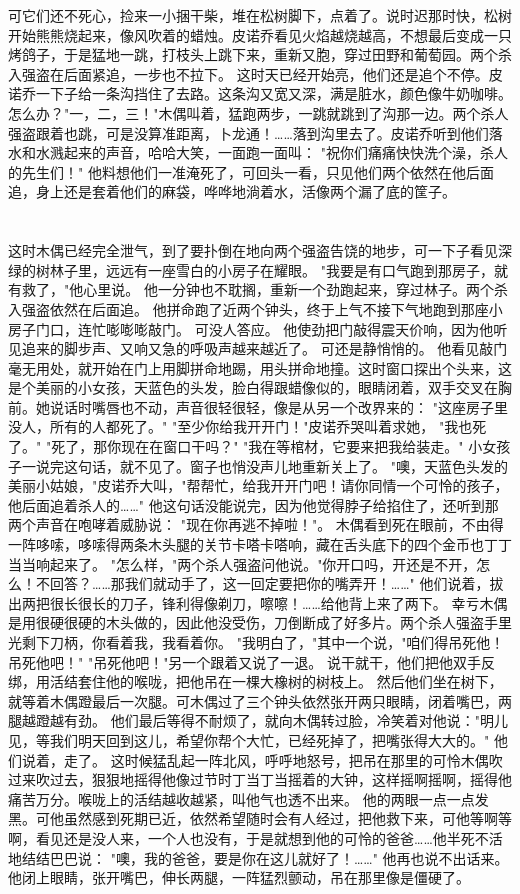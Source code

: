 \documentclass[12pt,UTF8]{ctexbook}
\begin{document}
可它们还不死心，捡来一小捆干柴，堆在松树脚下，点着了。说时迟那时快，松树开始熊熊烧起来，像风吹着的蜡烛。皮诺乔看见火焰越烧越高，不想最后变成一只烤鸽子，于是猛地一跳，打枝头上跳下来，重新又胞，穿过田野和葡萄园。两个杀入强盗在后面紧追，一步也不拉下。
这时天已经开始亮，他们还是追个不停。皮诺乔一下子给一条沟挡住了去路。这条沟又宽又深，满是脏水，颜色像牛奶咖啡。怎么办？"一，二，三！"木偶叫着，猛跑两步，一跳就跳到了沟那一边。两个杀人强盗跟着也跳，可是没算准距离，卜龙通！……落到沟里去了。皮诺乔听到他们落水和水溅起来的声音，哈哈大笑，一面跑一面叫：
"祝你们痛痛快快洗个澡，杀人的先生们！"
他料想他们一准淹死了，可回头一看，只见他们两个依然在他后面追，身上还是套着他们的麻袋，哗哗地淌着水，活像两个漏了底的筐子。

\chapter{}

这时木偶已经完全泄气，到了要扑倒在地向两个强盗告饶的地步，可一下子看见深绿的树林子里，远远有一座雪白的小房子在耀眼。
"我要是有口气跑到那房子，就有救了，"他心里说。
他一分钟也不耽搁，重新一个劲跑起来，穿过林子。两个杀入强盗依然在后面追。
他拼命跑了近两个钟头，终于上气不接下气地跑到那座小房子门口，连忙嘭嘭嘭敲门。
可没人答应。
他使劲把门敲得震天价响，因为他听见追来的脚步声、又响又急的呼吸声越来越近了。
可还是静悄悄的。
他看见敲门毫无用处，就开始在门上用脚拼命地踢，用头拼命地撞。这时窗口探出个头来，这是个美丽的小女孩，天蓝色的头发，脸白得跟蜡像似的，眼睛闭着，双手交叉在胸前。她说话时嘴唇也不动，声音很轻很轻，像是从另一个改界来的：
"这座房子里没人，所有的人都死了。"
"至少你给我开开门！"皮诺乔哭叫着求她，
"我也死了。"
"死了，那你现在在窗口干吗？"
"我在等棺材，它要来把我给装走。"
小女孩子一说完这句话，就不见了。窗子也悄没声儿地重新关上了。
"噢，天蓝色头发的美丽小姑娘，"皮诺乔大叫，"帮帮忙，给我开开门吧！请你同情一个可怜的孩子，他后面追着杀人的……"
他这句话没能说完，因为他觉得脖子给掐住了，还听到那两个声音在咆哮着威胁说：
"现在你再逃不掉啦！"。
木偶看到死在眼前，不由得一阵哆嗦，哆嗦得两条木头腿的关节卡嗒卡嗒响，藏在舌头底下的四个金币也丁丁当当响起来了。
"怎么样，"两个杀人强盗问他说。"你开口吗，开还是不开，怎么！不回答？……那我们就动手了，这一回定要把你的嘴弄开！……"
他们说着，拔出两把很长很长的刀子，锋利得像剃刀，嚓嚓！……给他背上来了两下。
幸亏木偶是用很硬很硬的木头做的，因此他没受伤，刀倒断成了好多片。两个杀人强盗手里光剩下刀柄，你看着我，我看着你。
"我明白了，"其中一个说，"咱们得吊死他！吊死他吧！"
"吊死他吧！"另一个跟着又说了一退。
说干就干，他们把他双手反绑，用活结套住他的喉咙，把他吊在一棵大橡树的树枝上。
然后他们坐在树下，就等着木偶蹬最后一次腿。可木偶过了三个钟头依然张开两只眼睛，闭着嘴巴，两腿越蹬越有劲。
他们最后等得不耐烦了，就向木偶转过脸，冷笑着对他说："明儿见，等我们明天回到这儿，希望你帮个大忙，已经死掉了，把嘴张得大大的。"
他们说着，走了。
这时候猛乱起一阵北风，呼呼地怒号，把吊在那里的可怜木偶吹过来吹过去，狠狠地摇得他像过节时丁当丁当摇着的大钟，这样摇啊摇啊，摇得他痛苦万分。喉咙上的活结越收越紧，叫他气也透不出来。
他的两眼一点一点发黑。可他虽然感到死期已近，依然希望随时会有人经过，把他救下来，可他等啊等啊，看见还是没人来，一个人也没有，于是就想到他的可怜的爸爸……他半死不活地结结巴巴说：
"噢，我的爸爸，要是你在这儿就好了！……"
他再也说不出话来。他闭上眼睛，张开嘴巴，伸长两腿，一阵猛烈颤动，吊在那里像是僵硬了。
\end{document}
